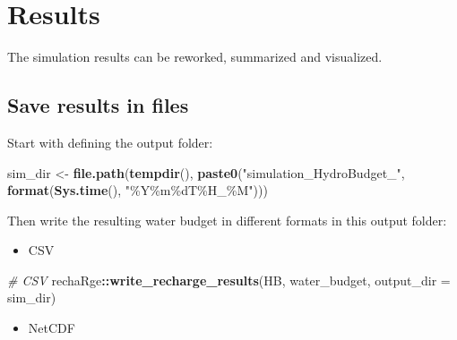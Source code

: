 \documentclass[
]{book}
\newenvironment{Shaded}{\begin{snugshade}}{\end{snugshade}}
\newcommand{\AttributeTok}[1]{\textcolor[rgb]{0.13,0.29,0.53}{#1}}
\newcommand{\CommentTok}[1]{\textcolor[rgb]{0.56,0.35,0.01}{\textit{#1}}}
\newcommand{\FunctionTok}[1]{\textcolor[rgb]{0.13,0.29,0.53}{\textbf{#1}}}
\newcommand{\NormalTok}[1]{#1}
\newcommand{\OtherTok}[1]{\textcolor[rgb]{0.56,0.35,0.01}{#1}}
\newcommand{\SpecialCharTok}[1]{\textcolor[rgb]{0.81,0.36,0.00}{\textbf{#1}}}
\newcommand{\StringTok}[1]{\textcolor[rgb]{0.31,0.60,0.02}{#1}}
\providecommand{\tightlist}{%
  \setlength{\itemsep}{0pt}\setlength{\parskip}{0pt}}
\begin{document}
\hypertarget{results}{%
\section{Results}\label{results}}

The simulation results can be reworked, summarized and visualized.

\hypertarget{save-results-in-files}{%
\subsection{Save results in files}\label{save-results-in-files}}

Start with defining the output folder:

\begin{Shaded}
\begin{Highlighting}[]
\NormalTok{sim\_dir }\OtherTok{\textless{}{-}} \FunctionTok{file.path}\NormalTok{(}\FunctionTok{tempdir}\NormalTok{(), }\FunctionTok{paste0}\NormalTok{(}\StringTok{"simulation\_HydroBudget\_"}\NormalTok{, }\FunctionTok{format}\NormalTok{(}\FunctionTok{Sys.time}\NormalTok{(), }\StringTok{"\%Y\%m\%dT\%H\_\%M"}\NormalTok{)))}
\end{Highlighting}
\end{Shaded}

Then write the resulting water budget in different formats in this output folder:

\begin{itemize}
\tightlist
\item
  CSV
\end{itemize}

\begin{Shaded}
\begin{Highlighting}[]
\CommentTok{\# CSV}
\NormalTok{rechaRge}\SpecialCharTok{::}\FunctionTok{write\_recharge\_results}\NormalTok{(HB, water\_budget, }\AttributeTok{output\_dir =}\NormalTok{ sim\_dir)}
\end{Highlighting}
\end{Shaded}

\begin{itemize}
\tightlist
\item
  NetCDF
\end{itemize}
\end{document}
